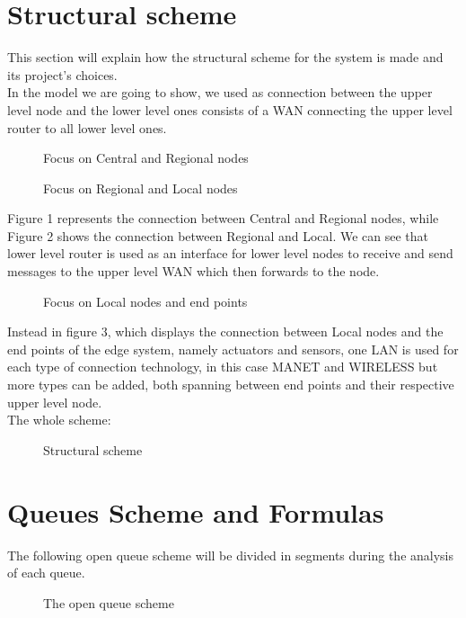 \documentclass[11pt]{article}
\begin{document}
\section{Structural scheme}
This section will explain how the structural scheme for the system is made and its project's choices.\\
In the model we are going to show, we used as connection between the upper level node and the lower level ones consists of a WAN connecting the upper level router to all lower level ones.\\
\begin{figure}[H]
	\hspace*{-3.75cm}
	\centering
  \frame{}
  \caption{Focus on Central and Regional nodes}
\end{figure}
\begin{figure}[H]
	\hspace*{-3.75cm}
	\frame{}
	\caption{Focus on Regional and Local nodes}
\end{figure}
Figure 1 represents the connection between Central and Regional nodes, while Figure 2 shows the connection between Regional and Local. We can  see that lower level router is used as an interface for lower level nodes to receive and send messages to the upper level WAN which then forwards to the node. \\
\begin{figure}[H]
	\hspace*{-3.75cm}
  \frame{}
  \caption{Focus on Local nodes and end points}
\end{figure}
Instead in figure 3, which displays the connection between Local nodes and the end points of the edge system, namely actuators and sensors, one LAN is used for each type of connection technology, in this case MANET and WIRELESS but more types can be added, both spanning between end points and their respective upper level node.\\
The whole scheme:
\begin{figure}[H]
	\hspace*{-3.75cm}
	\frame{}
  \caption{Structural scheme}
\end{figure}

\section{Queues Scheme and Formulas}
The following open queue scheme will be divided in segments during the analysis of each queue.
\begin{figure}[H]
	\vspace*{-0.5cm}
	\hspace*{-3.5cm}
	\centering
	\frame{}
	\caption{The open queue scheme}
\end{figure}
\end{document}
